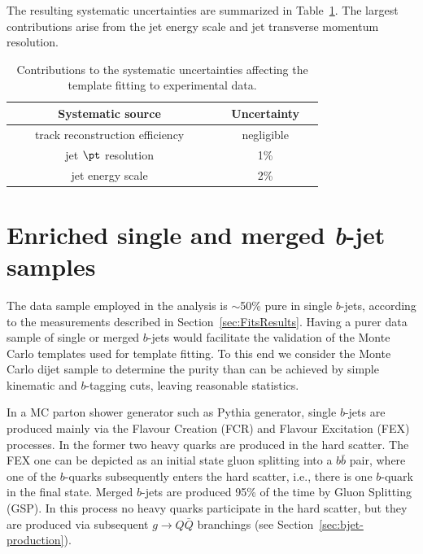 The resulting systematic uncertainties are summarized in Table~\ref{tb:systematicsfits}. The largest contributions arise from the jet energy scale and jet transverse momentum resolution.
\begin{table}[!hbt] %
\renewcommand{\arraystretch}{1.2}
\centering
\begin{tabular}{ | c | c |}
\hline
  ~~~~~~~Systematic source~~~~~~~ &~~Uncertainty~~\\ \hline
  track reconstruction efficiency  &    negligible        \\ 
  jet $\pt$ resolution  &    1\%        \\  
  jet energy scale  &    2\%        \\ 
\hline 
\end{tabular}
\caption{Contributions to the systematic uncertainties affecting the template fitting to experimental data.}
\label{tb:systematicsfits}
\end{table}


\section{Enriched single and merged {\em b}-jet samples}\label{sec:Enriched}

The data sample employed in the analysis is $\sim$50\% pure in single $b$-jets, according to the measurements described in Section~\ref{sec:FitsResults}. Having a purer data sample of single or  merged $b$-jets would facilitate the validation of the Monte Carlo templates used for template fitting. To this end we consider the Monte Carlo dijet sample to determine the purity than can be achieved by simple kinematic and $b$-tagging cuts, leaving reasonable statistics.

In a MC parton shower generator such as {\sc Pythia} generator, single $b$-jets are produced mainly via the Flavour Creation (FCR) and Flavour Excitation (FEX) processes.  In the former two heavy quarks are produced in the hard scatter. The FEX one can be depicted as an initial state gluon splitting into a $b\bar{b}$ pair, where one of the $b$-quarks subsequently enters the hard scatter, i.e., there is one $b$-quark in the final state.
Merged $b$-jets are produced 95\% of the time by Gluon Splitting (GSP). In this process no heavy quarks participate in the hard scatter, but they are produced via subsequent $g \rightarrow Q\bar{Q}$ branchings (see Section~\ref{sec:bjet-production}).

